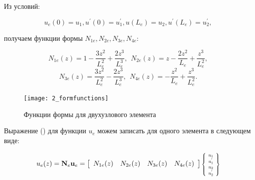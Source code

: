 \documentclass[7pt]{beamer}
\numberwithin{equation}{section}
\newcommand*{\Scale}[2][4]{\scalebox{#1}{$#2$}}
\begin{document}
\begin{frame}{}
	Из условий:
	\begin{block}{}
		\[u_e(0)=u_{1}, u^{'}(0)=u^{'}_{1}, u(L_e)=u_{2}, u^{'}(L_e)=u^{'}_{2},\] 
	\end{block}
	получаем функции формы $N_{1e},N_{2e},N_{3e},N_{4e}$:
	\begin{block}{} 
		\begin{equation}
			\label{beam1}
			N_{1e}(z)=1-\frac{3z^{2}}{L_e^{2}}+\frac{2z^{3}}{L_e^{3}},~~ N_{2e}(z)=z-\frac{2z^{2}}{L_e}+\frac{z^{3}}{L_e^{2}},
		\end{equation}
		\begin{equation}
			\label{beam2}
			N_{3e}(z)=\frac{3z^{2}}{L_e^{2}}-\frac{2z^{3}}{L_e^{3}},~~N_{4e}(z)=-\frac{z^{2}}{L_e}+\frac{z^{3}}{L_e^{2}}.
		\end{equation}
	\end{block}

	\begin{figure}[H]
		\centering
		\texttt{[image: 2\_formfunctions]}
		\caption{Функции формы для двухузлового элемента}
		\label{fig:hermite}
	\end{figure}
\end{frame}
	
\begin{frame}
Выражение () для функции $u_{e}$ можем записать для одного элемента в следующем виде:
	\begin{block}{}
		\[
			u_e(z)=\textbf{N}_e \textbf{u}_{e}=
			\left[
			\begin{array}{cccc}
				N_{1e}(z) & N_{2e}(z) & N_{3e}(z) & N_{4e}(z)
			\end{array}
			\right]
			\Scale[0.7] {
				\left\{
				\begin{array}{ccc}
					u_{1}   \\
					u^{'}_{1}  \\
						u_{2}\\
						u^{'}_{2}\\
				\end{array}
				\right\}
			}
		\]
	\end{block}
\end{frame}
\end{document}

